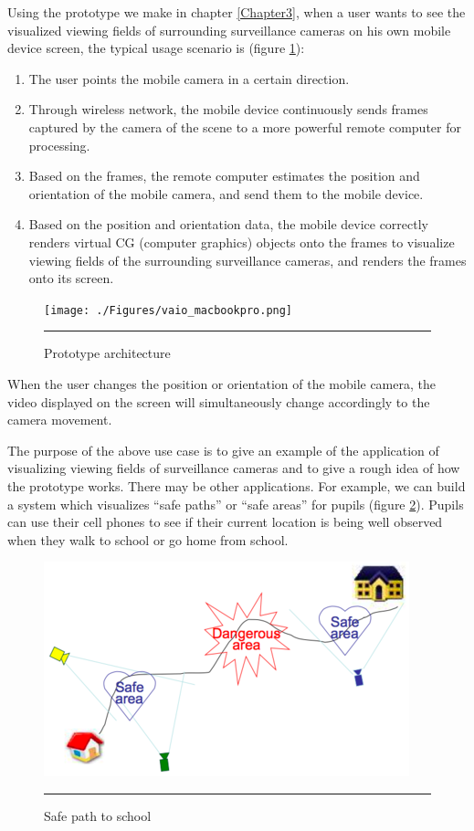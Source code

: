 Using the prototype we make in chapter \ref{Chapter3}, when a user wants to see the visualized viewing fields of surrounding surveillance cameras on his own mobile device screen, the typical usage scenario is (figure \ref{fig:VAIOMacBookPro}):

\begin{enumerate}
	\item The user points the mobile camera in a certain direction.
	\item Through wireless network, the mobile device continuously sends frames captured by the camera of the scene to a more powerful remote computer for processing.
	\item Based on the frames, the remote computer estimates the position and orientation of the mobile camera, and send them to the mobile device.
	\item Based on the position and orientation data, the mobile device correctly renders virtual CG (computer graphics) objects onto the frames to visualize viewing fields of the surrounding surveillance cameras, and renders the frames onto its screen.
\end{enumerate}

\begin{figure}[htbp]
	\centering
	\texttt{[image: ./Figures/vaio\_macbookpro.png]}
	\rule{35em}{0.5pt}
	\caption[Prototype architecture]{Prototype architecture}
	\label{fig:VAIOMacBookPro}
\end{figure}

When the user changes the position or orientation of the mobile camera, the video displayed on the screen will simultaneously change accordingly to the camera movement.

The purpose of the above use case is to give an example of the application of visualizing viewing fields of surveillance cameras and to give a rough idea of how the prototype works. There may be other applications. For example, we can build a system which visualizes ``safe paths'' or ``safe areas'' for pupils (figure \ref{fig:HomeSchool}). Pupils can use their cell phones to see if their current location is being well observed when they walk to school or go home from school.

\begin{figure}[htbp]
	\centering
	\includegraphics{./Primitives/home_school.png}
	\rule{35em}{0.5pt}
	\caption[Safe path to school]{Safe path to school}
	\label{fig:HomeSchool}
\end{figure}

